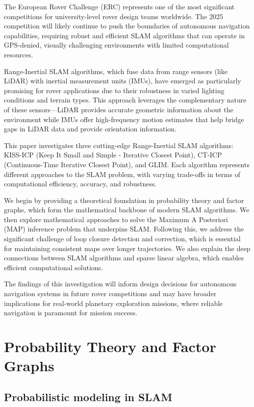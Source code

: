 \documentclass[journal]{IEEEtran}
\begin{document}
The European Rover Challenge (ERC) represents one of the most significant competitions for university-level rover design teams worldwide. The 2025 competition will likely continue to push the boundaries of autonomous navigation capabilities, requiring robust and efficient SLAM algorithms that can operate in GPS-denied, visually challenging environments with limited computational resources.

Range-Inertial SLAM algorithms, which fuse data from range sensors (like LiDAR) with inertial measurement units (IMUs), have emerged as particularly promising for rover applications due to their robustness in varied lighting conditions and terrain types. This approach leverages the complementary nature of these sensors—LiDAR provides accurate geometric information about the environment while IMUs offer high-frequency motion estimates that help bridge gaps in LiDAR data and provide orientation information.

This paper investigates three cutting-edge Range-Inertial SLAM algorithms: KISS-ICP (Keep It Small and Simple - Iterative Closest Point), CT-ICP (Continuous-Time Iterative Closest Point), and GLIM. Each algorithm represents different approaches to the SLAM problem, with varying trade-offs in terms of computational efficiency, accuracy, and robustness.

We begin by providing a theoretical foundation in probability theory and factor graphs, which form the mathematical backbone of modern SLAM algorithms. We then explore mathematical approaches to solve the Maximum A Posteriori (MAP) inference problem that underpins SLAM. Following this, we address the significant challenge of loop closure detection and correction, which is essential for maintaining consistent maps over longer trajectories. We also explain the deep connections between SLAM algorithms and sparse linear algebra, which enables efficient computational solutions.

The findings of this investigation will inform design decisions for autonomous navigation systems in future rover competitions and may have broader implications for real-world planetary exploration missions, where reliable navigation is paramount for mission success.

\section{Probability Theory and Factor Graphs}

\subsection{Probabilistic modeling in SLAM}
\end{document}

